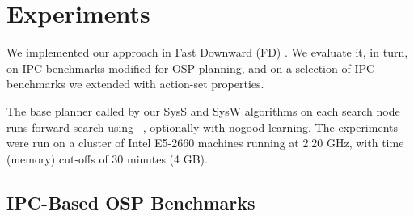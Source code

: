 

\newcommand{\scatterplotsize}{8cm}
\newcommand{\scatterplotxlabelshift}{1.5ex}
\newcommand{\scatterplotylabelshift}{-3ex}




\section{Experiments}
\label{experiments}


We implemented our approach in Fast Downward
(FD) \cite{helmert:jair-06}. We evaluate it, in turn, on IPC
benchmarks modified for OSP planning, and on a selection of IPC
benchmarks we extended with action-set properties.

The base planner called by our SysS and SysW algorithms on each search
node runs forward search using
\hff\ \cite{hoffmann:nebel:jair-01}, optionally 
with nogood learning.
%
%
The experiments were run on a cluster of Intel E5-2660 machines
running at 2.20 GHz, with time (memory) cut-offs of 30 minutes (4
GB).



 
\subsection{IPC-Based OSP Benchmarks}

%

